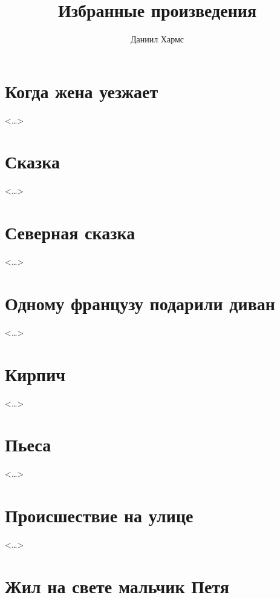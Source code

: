 \documentclass[a4paper,12pt]{article}
\title{Избранные произведения}
\author{Даниил Хармс}
\date{}
\newcommand{\storyend}{\begin{flushright}<\dots>\end{flushright}}
\begin{document}
\maketitle

\section{Когда жена уезжает}

\storyend

\section{Сказка}

\storyend

\section{Северная сказка}

\storyend

\section{Одному французу подарили диван}

\storyend

\section{Кирпич}

\storyend

\section{Пьеса}

\storyend

\section{Происшествие на улице}

\storyend

\section{Жил на свете мальчик Петя}

\end{document}
